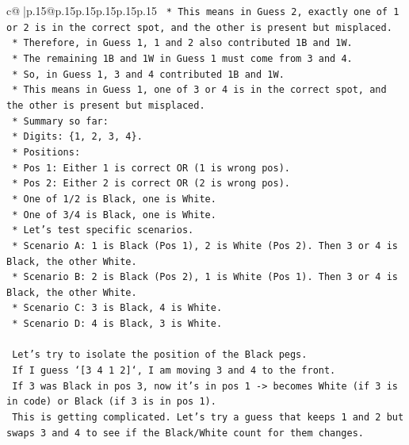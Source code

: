 \documentclass{article}
\begin{document}
{\begin{supertabular}{c@{$\;$}|p{.15\linewidth}@{}p{.15\linewidth}p{.15\linewidth}p{.15\linewidth}p{.15\linewidth}p{.15\linewidth}}
{{{\texttt{            *   This means in Guess 2, exactly one of 1 or 2 is in the correct spot, and the other is present but misplaced.} \\
\texttt{            *   Therefore, in Guess 1, 1 and 2 also contributed 1B and 1W.} \\
\texttt{            *   The remaining 1B and 1W in Guess 1 must come from 3 and 4.} \\
\texttt{            *   So, in Guess 1, 3 and 4 contributed 1B and 1W.} \\
\texttt{            *   This means in Guess 1, one of 3 or 4 is in the correct spot, and the other is present but misplaced.} \\
\texttt{            *   Summary so far:} \\
\texttt{                *   Digits: \{1, 2, 3, 4\}.} \\
\texttt{                *   Positions:} \\
\texttt{                    *   Pos 1: Either 1 is correct OR (1 is wrong pos).} \\
\texttt{                    *   Pos 2: Either 2 is correct OR (2 is wrong pos).} \\
\texttt{                    *   One of 1/2 is Black, one is White.} \\
\texttt{                    *   One of 3/4 is Black, one is White.} \\
\texttt{    *   Let's test specific scenarios.} \\
\texttt{        *   Scenario A: 1 is Black (Pos 1), 2 is White (Pos 2). Then 3 or 4 is Black, the other White.} \\
\texttt{        *   Scenario B: 2 is Black (Pos 2), 1 is White (Pos 1). Then 3 or 4 is Black, the other White.} \\
\texttt{        *   Scenario C: 3 is Black, 4 is White.} \\
\texttt{        *   Scenario D: 4 is Black, 3 is White.} \\
\\ 
\texttt{    Let's try to isolate the position of the Black pegs.} \\
\texttt{    If I guess `{[}3 4 1 2{]}`, I am moving 3 and 4 to the front.} \\
\texttt{    If 3 was Black in pos 3, now it's in pos 1 {-}> becomes White (if 3 is in code) or Black (if 3 is in pos 1).} \\
\texttt{    This is getting complicated. Let's try a guess that keeps 1 and 2 but swaps 3 and 4 to see if the Black/White count for them changes.} \\
}}}
\end{supertabular}}
\end{document}
